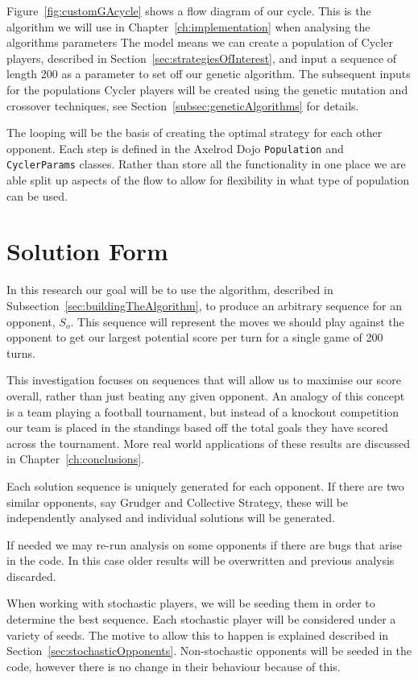 Figure~\ref{fig:customGAcycle} shows a flow diagram of our cycle.
This is the algorithm we will use in Chapter~\ref{ch:implementation} when analysing the algorithms parameters
The model means we can create a population of Cycler players, described in Section~\ref{sec:strategiesOfInterest}, and input a sequence of length 200 as a parameter to set off our genetic algorithm.
The subsequent inputs for the populations Cycler players will be created using the genetic mutation and crossover techniques, see Section~\ref{subsec:geneticAlgorithms} for details.

The looping will be the basis of creating the optimal strategy for each other opponent.
Each step is defined in the Axelrod Dojo \texttt{Population} and \texttt{CyclerParams} classes.
Rather than store all the functionality in one place we are able split up aspects of the flow to allow for flexibility in what type of population can be used.

\section{Solution Form}\label{sec:solutionForm}
In this research our goal will be to use the algorithm, described in Subsection~\ref{sec:buildingTheAlgorithm}, to produce an arbitrary sequence for an opponent, \(S_o\).
This sequence will represent the moves we should play against the opponent to get our largest potential score per turn for a single game of 200 turns.

This investigation focuses on sequences that will allow us to maximise our score overall, rather than just beating any given opponent.
An analogy of this concept is a team playing a football tournament, but instead of a knockout competition our team is placed in the standings based off the total goals they have scored across the tournament.
More real world applications of these results are discussed in Chapter~\ref{ch:conclusions}.

Each solution sequence is uniquely generated for each opponent.
If there are two similar opponents, say Grudger and Collective Strategy, these will be independently analysed and individual solutions will be generated.

If needed we may re-run analysis on some opponents if there are bugs that arise in the code.
In this case older results will be overwritten and previous analysis discarded.

When working with stochastic players, we will be seeding them in order to determine the best sequence.
Each stochastic player will be considered under a variety of seeds.
The motive to allow this to happen is explained described in Section~\ref{sec:stochasticOpponents}. Non-stochastic opponents will be seeded in the code, however there is no change in their behaviour because of this.

